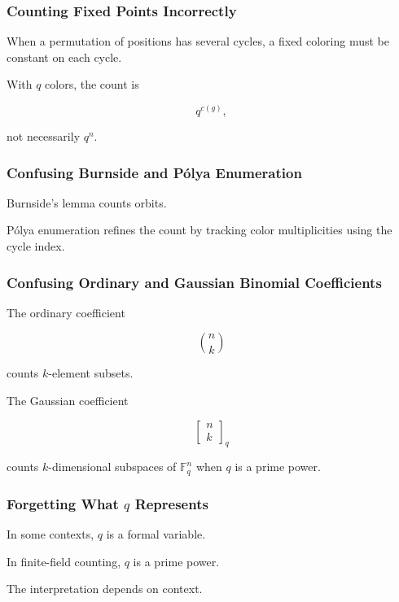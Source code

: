 \subsubsection{Counting Fixed Points Incorrectly}

When a permutation of positions has several cycles, a fixed coloring
must be constant on each cycle.

With \(q\) colors, the count is

\[
q^{c(g)},
\]

not necessarily \(q^n\).

\subsubsection{Confusing Burnside and P\'olya Enumeration}

Burnside's lemma counts orbits.

P\'olya enumeration refines the count by tracking color multiplicities
using the cycle index.

\subsubsection{Confusing Ordinary and Gaussian Binomial Coefficients}

The ordinary coefficient

\[
\binom{n}{k}
\]

counts \(k\)-element subsets.

The Gaussian coefficient

\[
\begin{bmatrix}
n\\
k
\end{bmatrix}_q
\]

counts \(k\)-dimensional subspaces of \(\mathbb{F}_q^n\) when \(q\) is
a prime power.

\subsubsection{Forgetting What \(q\) Represents}

In some contexts, \(q\) is a formal variable.

In finite-field counting, \(q\) is a prime power.

The interpretation depends on context.

